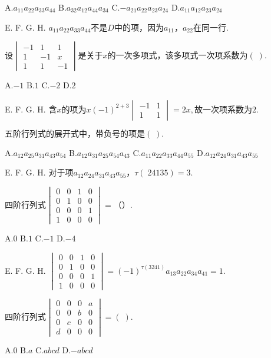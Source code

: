 A.$a_{11}a_{22}a_{33}a_{44}$   B.$a_{32}a_{12}a_{44}a_{34}$   C.$-a_{21}a_{22}a_{23}a_{24}$   D.$a_{11}a_{12}a_{23}a_{24}$

E.   F.   G.   H.
$a_{11}a_{22}a_{33}a_{44}\mathrm{不是}D\mathrm{中的项}，\mathrm{因为}a_{11}，a_{22}\mathrm{在同一行}.$


$设\begin{vmatrix}-1&1&1\\1&-1&x\\1&1&-1\end{vmatrix}\mathrm{是关于}x\mathrm{的一次多项式}，\mathrm{该多项式一次项系数为}(\;).$

A.$-1$   B.$1$   C.$-2$   D.$2$

E.   F.   G.   H.
$含x\mathrm{的项为}x(-1)^{2+3}\begin{vmatrix}-1&1\\1&1\end{vmatrix}=2x,\mathrm{故一次项系数为}2.$


$\mathrm{五阶行列式的展开式中}，\mathrm{带负号的项是}(\;).$

A.$a_{12}a_{25}a_{31}a_{43}a_{54}$   B.$a_{12}a_{31}a_{25}a_{54}a_{43}$   C.$a_{11}a_{22}a_{33}a_{44}a_{55}$   D.$a_{12}a_{24}a_{31}a_{43}a_{55}$

E.   F.   G.   H.
$\mathrm{对于项}a_{12}a_{24}a_{31}a_{43}a_{55}，\tau(\;24135)=3.$


$\mathrm{四阶行列式}\begin{vmatrix}0&0&1&0\\0&1&0&0\\0&0&0&1\\1&0&0&0\end{vmatrix}=（）.$

A.$0$   B.$1$   C.$-1$   D.$-4$

E.   F.   G.   H.
$\begin{vmatrix}0&0&1&0\\0&1&0&0\\0&0&0&1\\1&0&0&0\end{vmatrix}=(-1)^{\tau(3241)}a_{13}a_{22}a_{34}a_{41}=1.$


$\mathrm{四阶行列式}\begin{vmatrix}0&0&0&a\\0&0&b&0\\0&c&0&0\\d&0&0&0\end{vmatrix}=(\;).$

A.$0$   B.$a$   C.$abcd$   D.$-abcd$

